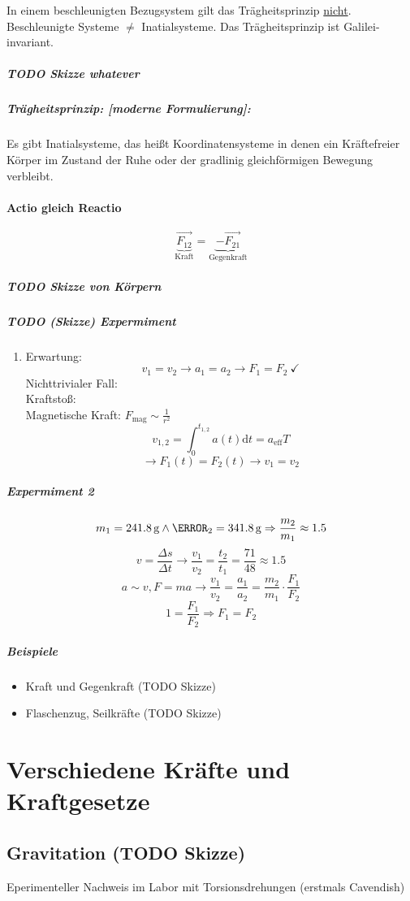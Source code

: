 \documentclass[a4paper]{scrartcl}
\renewcommand{\d}{\mathrm{d}}
\newcommand{\f}[2]{{\frac{#1}{#2}}}
\renewcommand{\v}[1]{\vec{#1}}
\theoremstyle{definition}
\theoremstyle{plain}
\theoremstyle{plain}
\theoremstyle{remark}
\theoremstyle{remark}
\theoremstyle{remark}
\begin{document}
In einem beschleunigten Bezugsystem gilt das Trägheitsprinzip \uline{nicht}. Beschleunigte Systeme $\neq$ Inatialsysteme.
Das Trägheitsprinzip ist Galilei-invariant.

\subparagraph{{\bfseries\sffamily TODO} Skizze whatever}
\label{sec-2-2-1-5-1}
\subparagraph{Trägheitsprinzip: [moderne Formulierung]:}
\label{sec-2-2-1-5-2}
Es gibt Inatialsysteme, das heißt Koordinatensysteme  in denen ein Kräftefreier Körper im Zustand der Ruhe oder der gradlinig gleichförmigen Bewegung verbleibt.

\paragraph{Actio gleich Reactio}
\label{sec-2-2-1-6}
\[\underbrace{\v{F_{12}}}_{\text{Kraft}} = \underbrace{-\v{F_{21}}}_{\text{Gegenkraft}}\]
\subparagraph{{\bfseries\sffamily TODO} Skizze von Körpern}
\label{sec-2-2-1-6-1}
\subparagraph{{\bfseries\sffamily TODO} (Skizze) Expermiment}
\label{sec-2-2-1-6-2}
\begin{enumerate}
\item Erwartung:
\label{sec-2-2-1-6-2-1}
\[v_1 = v_2 \rightarrow a_1 = a_2 \rightarrow F_1 = F_2~\checkmark\]
Nichttrivialer Fall: \\
       Kraftstoß: \\
       Magnetische Kraft: $F_{\text{mag}} \sim {\f{1}{r^2}}$
\[v_{1,2} = \int_0^{t_{1,2}} a(t)\d t = a_{\text{eff}}T\]
\[\rightarrow F_1(t) = F_2(t) \rightarrow v_1 = v_2\]
\end{enumerate}
\subparagraph{Expermiment 2}
\label{sec-2-2-1-6-3}
\[m_1 = \SI{241.8}{\gram} \wedge \m_2 = \SI{341.8}{\gram} \Rightarrow \f{m_2}{m_1} \approx 1.5\]
\[v = \f{\Delta s}{\Delta t} \rightarrow \f{v_1}{v_2} = \f{t_2}{t_1} = \f{71}{48} \approx 1.5\]
\[a\sim v, F = m a \rightarrow \f{v_1}{v_2} = \f{a_1}{a_2} = \f{m_2}{m_1}\cdot \f{F_1}{F_2}\]
\[1 = \f{F_1}{F_2} \Rightarrow F_1 = F_2\]
\subparagraph{Beispiele}
\label{sec-2-2-1-6-4}
\begin{itemize}
\item Kraft und Gegenkraft (TODO Skizze)
\item Flaschenzug, Seilkräfte (TODO Skizze)
\end{itemize}
\section{Verschiedene Kräfte und Kraftgesetze}
\label{sec-3}
\subsection{Gravitation (TODO Skizze)}
\label{sec-3-1}
Eperimenteller Nachweis im Labor mit Torsionsdrehungen (erstmals Cavendish)
\end{document}
